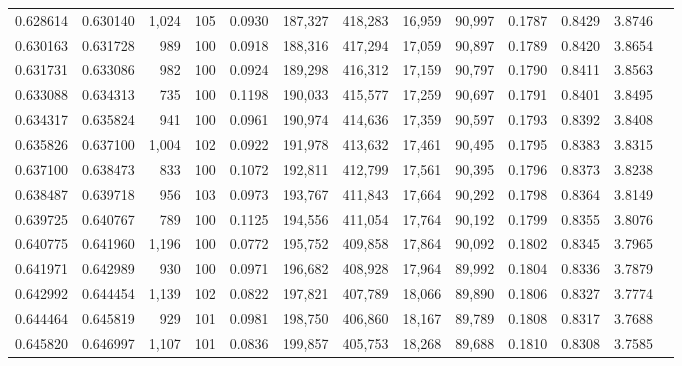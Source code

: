 \begin{tabular}{rrrrrrrrrrrrr}
0.628614 & 0.630140 & 1,024 & 105 &                                     0.0930 & 187,327 & 418,283 &  16,959 &  90,997 & 0.1787 & 0.8429 & 3.8746 \\
0.630163 & 0.631728 &   989 & 100 &                                     0.0918 & 188,316 & 417,294 &  17,059 &  90,897 & 0.1789 & 0.8420 & 3.8654 \\
0.631731 & 0.633086 &   982 & 100 &                                     0.0924 & 189,298 & 416,312 &  17,159 &  90,797 & 0.1790 & 0.8411 & 3.8563 \\
0.633088 & 0.634313 &   735 & 100 &                                     0.1198 & 190,033 & 415,577 &  17,259 &  90,697 & 0.1791 & 0.8401 & 3.8495 \\
0.634317 & 0.635824 &   941 & 100 &                                     0.0961 & 190,974 & 414,636 &  17,359 &  90,597 & 0.1793 & 0.8392 & 3.8408 \\
0.635826 & 0.637100 & 1,004 & 102 &                                     0.0922 & 191,978 & 413,632 &  17,461 &  90,495 & 0.1795 & 0.8383 & 3.8315 \\
0.637100 & 0.638473 &   833 & 100 &                                     0.1072 & 192,811 & 412,799 &  17,561 &  90,395 & 0.1796 & 0.8373 & 3.8238 \\
0.638487 & 0.639718 &   956 & 103 &                                     0.0973 & 193,767 & 411,843 &  17,664 &  90,292 & 0.1798 & 0.8364 & 3.8149 \\
0.639725 & 0.640767 &   789 & 100 &                                     0.1125 & 194,556 & 411,054 &  17,764 &  90,192 & 0.1799 & 0.8355 & 3.8076 \\
0.640775 & 0.641960 & 1,196 & 100 &                                     0.0772 & 195,752 & 409,858 &  17,864 &  90,092 & 0.1802 & 0.8345 & 3.7965 \\
0.641971 & 0.642989 &   930 & 100 &                                     0.0971 & 196,682 & 408,928 &  17,964 &  89,992 & 0.1804 & 0.8336 & 3.7879 \\
0.642992 & 0.644454 & 1,139 & 102 &                                     0.0822 & 197,821 & 407,789 &  18,066 &  89,890 & 0.1806 & 0.8327 & 3.7774 \\
0.644464 & 0.645819 &   929 & 101 &                                     0.0981 & 198,750 & 406,860 &  18,167 &  89,789 & 0.1808 & 0.8317 & 3.7688 \\
0.645820 & 0.646997 & 1,107 & 101 &                                     0.0836 & 199,857 & 405,753 &  18,268 &  89,688 & 0.1810 & 0.8308 & 3.7585 \\

\end{tabular}
